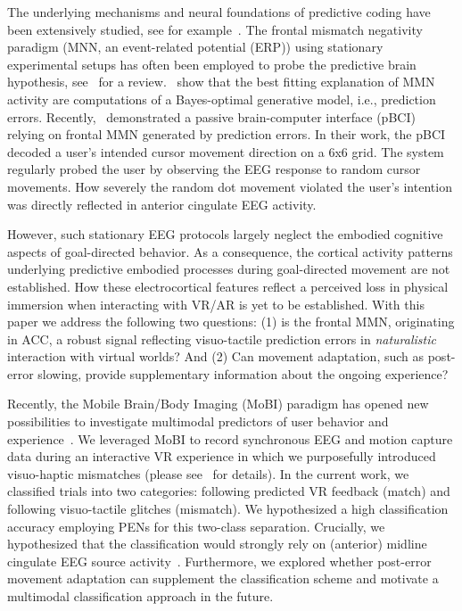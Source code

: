 The underlying mechanisms and neural foundations of predictive coding have been extensively studied, see for example~\cite{Holroyd2002-in, Clark2013-ah, Bendixen2012-jx}. The frontal mismatch negativity paradigm (MNN, an event-related potential (ERP)) using stationary experimental setups has often been employed to probe the predictive brain hypothesis, see~\citet{Stefanics2014-vk} for a review.~\citet{Lieder2013-dl} show that the best fitting explanation of MMN activity are computations of a Bayes-optimal generative model, i.e., prediction errors. Recently,~\citet{Zander2016-ed} demonstrated a passive brain-computer interface (pBCI) relying on frontal MMN generated by prediction errors. In their work, the pBCI decoded a user's intended cursor movement direction on a 6x6 grid. The system regularly probed the user by observing the EEG response to random cursor movements. How severely the random dot movement violated the user's intention was directly reflected in anterior cingulate EEG activity. 

However, such stationary EEG protocols largely neglect the embodied cognitive aspects of goal-directed behavior. As a consequence, the cortical activity patterns underlying predictive embodied processes during goal-directed movement are not established. How these electrocortical features reflect a perceived loss in physical immersion when interacting with VR/AR is yet to be established. With this paper we address the following two questions: (1) is the frontal MMN, originating in ACC, a robust signal reflecting visuo-tactile prediction errors in \textit{naturalistic} interaction with virtual worlds? And (2) Can movement adaptation, such as post-error slowing, provide supplementary information about the ongoing experience?

Recently, the Mobile Brain/Body Imaging (MoBI) paradigm has opened new possibilities to investigate multimodal predictors of user behavior and experience~\cites{Makeig2009-je, Gramann2011-fr, Gramann2014-qo, Jungnickel2019-mv}. We leveraged MoBI to record synchronous EEG and motion capture data during an interactive VR experience in which we purposefully introduced visuo-haptic mismatches (please see~\cite{Gehrke2019-og} for details). In the current work, we classified trials into two categories: following predicted VR feedback (match) and following visuo-tactile glitches (mismatch). We hypothesized a high classification accuracy employing PENs for this two-class separation. Crucially, we hypothesized that the classification would strongly rely on (anterior) midline cingulate EEG source activity~\cite{Zander2016-ed, Tollner2017-rm}. Furthermore, we explored whether post-error movement adaptation can supplement the classification scheme and motivate a multimodal classification approach in the future. 


